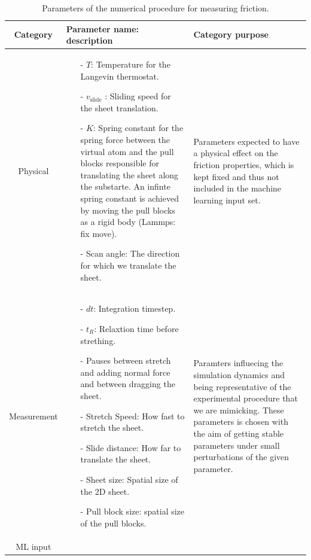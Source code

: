 \begin{table}[H]
  \begin{center}
  \caption{Parameters of the numerical procedure for measuring friction.}
  \label{tab:param}
  \begin{tabular}{ | c | m{8cm}| m{5cm}|} 
    \hline
    Category & Parameter name: description & Category purpose \\ 
    \hline
    Physical & 
    \begin{itemize}
      \item[-] $T$: Temperature for the Langevin thermostat.
      \item[-] $v_{\text{slide}}$ : Sliding speed for the sheet translation.
      \item[-] $K$: Spring constant for the spring force between the virtual atom and the pull blocks responsible for translating the sheet along the substarte. An infinte spring constant is achieved by moving the pull blocks as a rigid body (Lammps: fix move).
      \item[-] Scan angle: The direction for which we translate the sheet.
    \end{itemize} &
    Parameters expected to have a physical effect on the friction properties, which is kept fixed and thus not included in the machine learning input set. 
    \\ \hline
    Measurement & 
    \begin{itemize}
      \item[-] $dt$: Integration timestep.
      \item[-] $t_R$: Relaxtion time before strething.
      \item[-] Pauses between stretch and adding normal force and between dragging the sheet.  
      \item[-] Stretch Speed: How fast to stretch the sheet.
      \item[-] Slide distance: How far to translate the sheet.
      \item[-] Sheet size: Spatial size of the 2D sheet.  
      \item[-] Pull block size: spatial size of the pull blocks.
    \end{itemize} &
    Paramters influecing the simulation dynamics and being representative of the experimental procedure that we are mimicking. These parameters is chosen with the aim of getting stable parameters under small perturbations of the given parameter. 
     \\ \hline
    ML input & 
    \begin{itemize}

\end{itemize}
\end{tabular}
\end{center}
\end{table}
